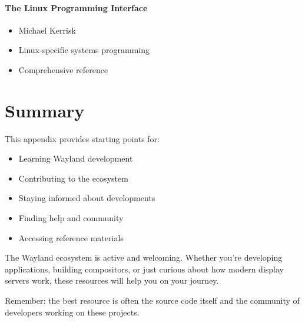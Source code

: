 \paragraph{The Linux Programming Interface}
\begin{itemize}
    \item Michael Kerrisk
    \item Linux-specific systems programming
    \item Comprehensive reference
\end{itemize}

\section{Summary}

This appendix provides starting points for:
\begin{itemize}
    \item Learning Wayland development
    \item Contributing to the ecosystem
    \item Staying informed about developments
    \item Finding help and community
    \item Accessing reference materials
\end{itemize}

The Wayland ecosystem is active and welcoming. Whether you're developing applications, building compositors, or just curious about how modern display servers work, these resources will help you on your journey.

Remember: the best resource is often the source code itself and the community of developers working on these projects.

\clearpage
